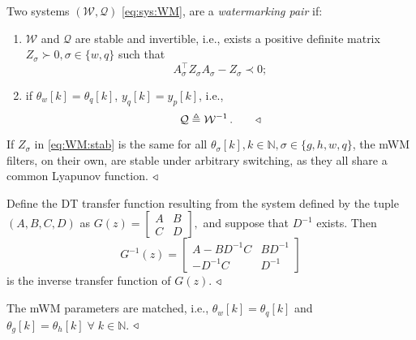 \begin{definition}\label{def:WM}
Two systems $(\mathcal W,\mathcal Q)$ \eqref{eq:sys:WM}, are a \textit{watermarking pair} if:
\begin{enumerate}[label=\alph*.]
    \item \label{def:WM:inv} $\mathcal{W}$ and $\mathcal{Q}$ are stable and invertible, i.e., exists a positive definite matrix $Z_\sigma \succ 0, \sigma \in \{w,q\}$ such that %
    \begin{equation}\label{eq:WM:stab}
        A_\sigma^\top Z_\sigma A_\sigma - Z_\sigma \prec 0;
    \end{equation}
    \item \label{def:WM:eqParam} if $\theta_w[k] = \theta_q[k]$, $y_q[k] = y_p[k]$, i.e., 
    \begin{equation}\label{eq:WM:def}
	   \mathcal{Q} \triangleq \mathcal{W}^{-1}\,. \qquad \triangleleft
    \end{equation}
\end{enumerate}
\end{definition}
\begin{remark}\label{rem:stabSw}
    If $Z_\sigma$ in \eqref{eq:WM:stab} is the same for all $\theta_\sigma[k], k \in \mathbb N,\sigma\in\{g,h,w,q\}$, the mWM filters, on their own, are stable under arbitrary switching, as they all share a common Lyapunov function.
    $\hfill \triangleleft$
\end{remark}

\begin{definition}\label{def:inv:ss}
		Define the DT transfer function resulting from the system defined by the tuple $(A,B,C,D)$ as $			G(z) = \left[\begin{array}{c|c}
				A &B\\
				\hline
				C &D
			\end{array}
			\right],$
		and suppose that $D^{-1}$ exists. Then
		\begin{equation}\label{eq:sys:inv}
			G^{-1}(z) = \left[\begin{array}{c|c}
				A - BD^{-1}C    &BD^{-1}\\
				\hline
				-D^{-1}C        &D^{-1}
			\end{array}
			\right]
		\end{equation}
		is the inverse transfer function of $G(z)$.
		$\hfill\triangleleft$
	\end{definition}
\begin{assumption}\label{ass:sync}
    The mWM parameters are matched, i.e., $\theta_w[k] = \theta_q[k]$ and $\theta_g[k] = \theta_h[k]\; \forall\;k \in \mathbb{N}$.
    $\hfill \triangleleft$
\end{assumption}

